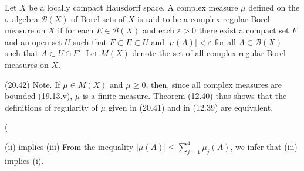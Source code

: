Let $X$ be a locally compact Hausdorff space. A complex measure $\mu$ defined on the $\sigma$-algebra $\mathcal{B}(X)$ of Borel sets of $X$ is said to be a complex regular Borel measure on $X$ if for each $E \in \mathcal{B}(X)$ and each $\varepsilon > 0$ there exist a compact set $F$ and an open set $U$ such that $F \subset E \subset U$ and $|\mu(A)| < \varepsilon$ for all $A \in \mathcal{B}(X)$ such that $A \subset U \cap F'$. Let $M(X)$ denote the set of all complex regular Borel measures on $X$.

(20.42) Note. If $\mu \in M(X)$ and $\mu \geq 0$, then, since all complex measures are bounded (19.13.v), $\mu$ is a finite measure. Theorem (12.40) thus shows that the definitions of regularity of $\mu$ given in (20.41) and in (12.39) are equivalent.

(

(ii) implies (iii) From the inequality $|\mu(A)| \leq \sum_{j=1}^{4} \mu_j(A)$, we infer that (iii) implies (i).